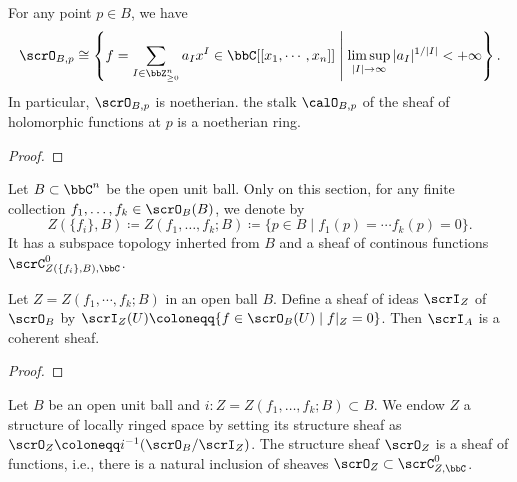 \begin{proposition}\label{prop:stalk-of-sheaf-of-holomorphic-functions-is-local-noetherian-regular}
	For any point \(p \in B\), we have
	\[ \scrO_{B,p} \cong \left\{ f = \sum_{I \in \bbZ_{\geq 0}^n} a_I x^I \in \bbC[[x_1,\cdots, x_n]] \;\middle|\; \limsup_{|I| \to \infty} |a_I|^{1/|I|} < +\infty \right\}. \]
	In particular, $\scrO_{B,p}$ is noetherian.
	the stalk \(\calO_{B, p}\) of the sheaf of holomorphic functions at \(p\) is a noetherian ring.
\end{proposition}
\begin{proof}
\end{proof}


\begin{notation}\label{notation:underlying-sets-of-local-model}
	Let $B \subset \bbC^n$ be the open unit ball.
	Only on this section, for any finite collection $f_1,\ldots,f_k \in \scrO_B(B)$, we denote by
	\[ Z(\{f_i\},B) \coloneqq Z(f_1,\ldots,f_k;B) \coloneqq \{p \in B \;|\; f_1(p) = \cdots f_k(p) = 0 \}. \]
	It has a subspace topology inherted from $B$ and a sheaf of continous functions $\scrC_{Z(\{f_i\},B),\bbC}^0$.
\end{notation}

\begin{lemma}
	Let $Z = Z(f_1,\cdots,f_k;B)$ in an open ball $B$.
	Define a sheaf of ideas $\scrI_Z$ of $\scrO_B$ by $\scrI_Z(U) \coloneqq \{f \in \scrO_B(U)\; |\; f|_Z = 0 \}$.
	Then $\scrI_A$ is a coherent sheaf.
\end{lemma}
\begin{proof}
\end{proof}

Let $B$ be an open unit ball and \(i: Z = Z(f_1,\ldots,f_k;B) \subset B\).
We endow $Z$ a structure of locally ringed space by setting its structure sheaf as $\scrO_Z \coloneqq i^{-1}( \scrO_B / \scrI_Z )$.
The structure sheaf $\scrO_Z$ is a sheaf of functions, i.e., there is a natural inclusion of sheaves $\scrO_Z \subset \scrC^0_{Z,\bbC}$.\Yang{}

